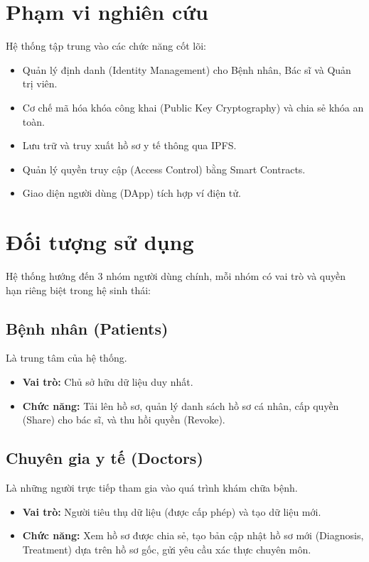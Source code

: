 \documentclass[12pt,a4paper]{report}
\begin{document}
\section{Phạm vi nghiên cứu}
Hệ thống tập trung vào các chức năng cốt lõi:
\begin{itemize}
    \item Quản lý định danh (Identity Management) cho Bệnh nhân, Bác sĩ và Quản trị viên.
    \item Cơ chế mã hóa khóa công khai (Public Key Cryptography) và chia sẻ khóa an toàn.
    \item Lưu trữ và truy xuất hồ sơ y tế thông qua IPFS.
    \item Quản lý quyền truy cập (Access Control) bằng Smart Contracts.
    \item Giao diện người dùng (DApp) tích hợp ví điện tử.
\end{itemize}

\section{Đối tượng sử dụng}
Hệ thống hướng đến 3 nhóm người dùng chính, mỗi nhóm có vai trò và quyền hạn riêng biệt trong hệ sinh thái:

\subsection{Bệnh nhân (Patients)}
Là trung tâm của hệ thống.
\begin{itemize}
    \item \textbf{Vai trò:} Chủ sở hữu dữ liệu duy nhất.
    \item \textbf{Chức năng:} Tải lên hồ sơ, quản lý danh sách hồ sơ cá nhân, cấp quyền (Share) cho bác sĩ, và thu hồi quyền (Revoke).
\end{itemize}

\subsection{Chuyên gia y tế (Doctors)}
Là những người trực tiếp tham gia vào quá trình khám chữa bệnh.
\begin{itemize}
    \item \textbf{Vai trò:} Người tiêu thụ dữ liệu (được cấp phép) và tạo dữ liệu mới.
    \item \textbf{Chức năng:} Xem hồ sơ được chia sẻ, tạo bản cập nhật hồ sơ mới (Diagnosis, Treatment) dựa trên hồ sơ gốc, gửi yêu cầu xác thực chuyên môn.
\end{itemize}
\end{document}
